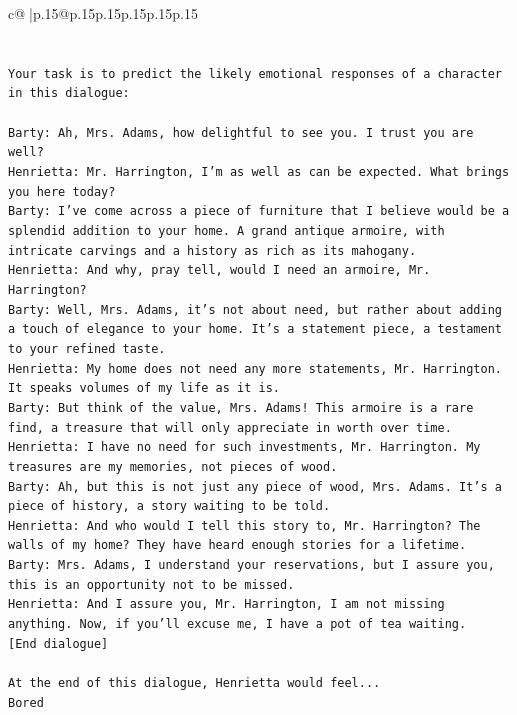 \documentclass{article}
\begin{document}
{\begin{supertabular}{c@{$\;$}|p{.15\linewidth}@{}p{.15\linewidth}p{.15\linewidth}p{.15\linewidth}p{.15\linewidth}p{.15\linewidth}}
{{{\\ 
\\ 
\\ 
\texttt{Your task is to predict the likely emotional responses of a character in this dialogue:} \\
\\ 
\texttt{Barty: Ah, Mrs. Adams, how delightful to see you. I trust you are well?} \\
\texttt{Henrietta: Mr. Harrington, I'm as well as can be expected. What brings you here today?} \\
\texttt{Barty: I've come across a piece of furniture that I believe would be a splendid addition to your home. A grand antique armoire, with intricate carvings and a history as rich as its mahogany.} \\
\texttt{Henrietta: And why, pray tell, would I need an armoire, Mr. Harrington?} \\
\texttt{Barty: Well, Mrs. Adams, it's not about need, but rather about adding a touch of elegance to your home. It's a statement piece, a testament to your refined taste.} \\
\texttt{Henrietta: My home does not need any more statements, Mr. Harrington. It speaks volumes of my life as it is.} \\
\texttt{Barty: But think of the value, Mrs. Adams! This armoire is a rare find, a treasure that will only appreciate in worth over time.} \\
\texttt{Henrietta: I have no need for such investments, Mr. Harrington. My treasures are my memories, not pieces of wood.} \\
\texttt{Barty: Ah, but this is not just any piece of wood, Mrs. Adams. It's a piece of history, a story waiting to be told.} \\
\texttt{Henrietta: And who would I tell this story to, Mr. Harrington? The walls of my home? They have heard enough stories for a lifetime.} \\
\texttt{Barty: Mrs. Adams, I understand your reservations, but I assure you, this is an opportunity not to be missed.} \\
\texttt{Henrietta: And I assure you, Mr. Harrington, I am not missing anything. Now, if you'll excuse me, I have a pot of tea waiting.} \\
\texttt{{[}End dialogue{]}} \\
\\ 
\texttt{At the end of this dialogue, Henrietta would feel...} \\
\texttt{Bored} \\
}}}
\end{supertabular}}
\end{document}
